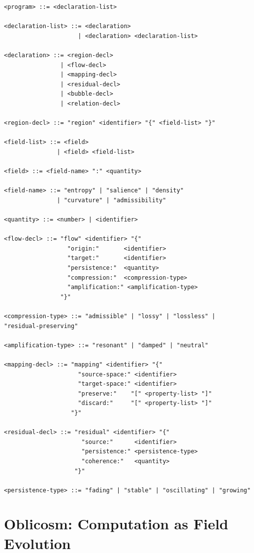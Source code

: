 \documentclass[12pt,oneside]{book}
\theoremstyle{plain}
\theoremstyle{definition}
\theoremstyle{plain}
\begin{document}
\begin{lstlisting}
<program> ::= <declaration-list>

<declaration-list> ::= <declaration>
                     | <declaration> <declaration-list>

<declaration> ::= <region-decl>
                | <flow-decl>
                | <mapping-decl>
                | <residual-decl>
                | <bubble-decl>
                | <relation-decl>

<region-decl> ::= "region" <identifier> "{" <field-list> "}"

<field-list> ::= <field>
               | <field> <field-list>

<field> ::= <field-name> ":" <quantity>

<field-name> ::= "entropy" | "salience" | "density"
               | "curvature" | "admissibility"

<quantity> ::= <number> | <identifier>

<flow-decl> ::= "flow" <identifier> "{"
                  "origin:"       <identifier>
                  "target:"       <identifier>
                  "persistence:"  <quantity>
                  "compression:"  <compression-type>
                  "amplification:" <amplification-type>
                "}"

<compression-type> ::= "admissible" | "lossy" | "lossless" | "residual-preserving"

<amplification-type> ::= "resonant" | "damped" | "neutral"

<mapping-decl> ::= "mapping" <identifier> "{"
                     "source-space:" <identifier>
                     "target-space:" <identifier>
                     "preserve:"    "[" <property-list> "]"
                     "discard:"     "[" <property-list> "]"
                   "}"

<residual-decl> ::= "residual" <identifier> "{"
                      "source:"      <identifier>
                      "persistence:" <persistence-type>
                      "coherence:"   <quantity>
                    "}"

<persistence-type> ::= "fading" | "stable" | "oscillating" | "growing"
\end{lstlisting}

\chapter{Oblicosm: Computation as Field Evolution}
\label{ch:oblicosm}
\end{document}
